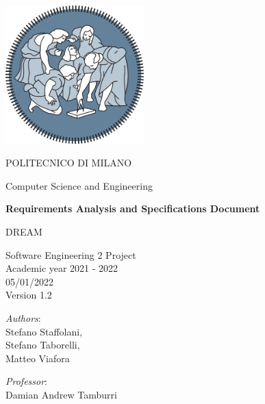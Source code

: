 \begin{titlepage}
    \begin{center}
		\includegraphics[width=0.4\textwidth]{Images/logo_polimi.png}
		
		\vspace{0.25cm}
		
		\LARGE POLITECNICO DI MILANO\\
		
		\vspace{0.2cm}
		
		\Large Computer Science and Engineering
		
		\vspace{0.8cm}
	
		\Huge \textbf{Requirements Analysis and Specifications Document}
		
		\vspace{0.5cm}
		\huge DREAM 
		
		\vspace{1.5cm}
		\LARGE Software Engineering 2 Project\\
		\Large Academic year 2021 - 2022\\
		\vspace{1cm}
		05/01/2022
		\\Version 1.2
		\vspace{2.5cm}
		
		\large
		\begin{minipage}{.1\textwidth}
			\null
		\end{minipage}%
		\begin{minipage}{.4\textwidth}
			\textit{Authors}:\\
			Stefano Staffolani,\\
			Stefano Taborelli,\\
			Matteo Viafora
		\end{minipage}%
		\begin{minipage}{.4\textwidth}
			\raggedleft	
			\textit{Professor}:\\
			Damian Andrew Tamburri\\
			\phantom{placeholder}
		\end{minipage}%
		\begin{minipage}{.1\textwidth}
			\null
		\end{minipage}
	
			
		\end{center}
\end{titlepage}